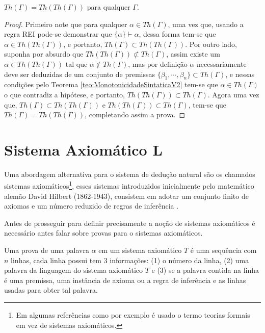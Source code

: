\begin{teorema}\label{teo:PontoFixo}
  $Th(\Gamma) = Th(Th(\Gamma))$ para qualquer $\Gamma$.
\end{teorema}

\begin{proof}
  Primeiro note que para qualquer $\alpha \in Th(\Gamma)$, uma vez que, usando a regra REI pode-se demonstrar que $\{\alpha\} \vdash \alpha$, dessa forma tem-se que $\alpha \in Th(Th(\Gamma))$, e portanto, $Th(\Gamma) \subset Th(Th(\Gamma))$. Por outro lado, suponha por absurdo que $Th(Th(\Gamma)) \not\subset Th(\Gamma)$, assim existe um $\alpha \in Th(Th(\Gamma))$ tal que $\alpha \not\in Th(\Gamma)$, mas por definição $\alpha$ necessariamente deve ser deduzidas de um conjunto de premissas $\{\beta_1, \cdots, \beta_n\} \subset Th(\Gamma)$, e nessas condições pelo Teorema \ref{teo:MonotonicidadeSintaticaV2} tem-se que $\alpha \in Th(\Gamma)$ o que contradiz a hipótese, e portanto, $Th(Th(\Gamma)) \subset Th(\Gamma)$. Agora uma vez que, $Th(\Gamma) \subset Th(Th(\Gamma))$ e $Th(Th(\Gamma)) \subset Th(\Gamma)$, tem-se que $Th(\Gamma) = Th(Th(\Gamma))$, completando assim a prova.
\end{proof}

\section{Sistema Axiomático L}\label{sec:SistemaAxiomatico}

Uma abordagem alternativa para o sistema de dedução natural são os chamados sistemas axiomáticos\footnote{Em algumas referências como por exemplo \cite{benja-Logica, leonidas2002} é usado o termo teorias formais em vez de sistemas axiomáticos.}, esses sistemas introduzidos inicialmente pelo matemático alemão David Hilbert (1862-1943), consistem em adotar um conjunto finito de axiomas e um número reduzido de regras de inferência \cite{joaoPavao2014, sernadas2006}.

Antes de prosseguir para definir precisamente a noção de sistemas axiomáticos é necessário antes falar sobre provas para o sistemas axiomáticos.

\begin{definicao}\label{def:ProvaAxiomatica}
  \cite{leonidas2002} Uma prova de uma palavra $\alpha$ em um sistema axiomático $T$ é uma sequência com $n$ linhas, cada linha possui tem $3$ informações: (1) o número da linha, (2) uma palavra da linguagem do sistema axiomático $T$ e (3) se a palavra contida na linha é uma premissa, uma instância de axioma ou a regra de inferência e as linhas usadas para obter tal palavra. 
\end{definicao}

